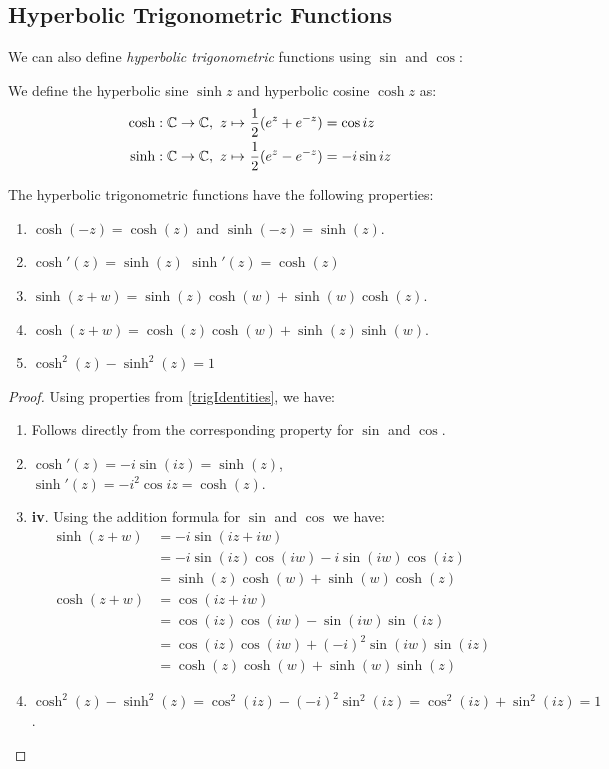 \documentclass[../main.tex]{subfiles}
\begin{document}
\subsection{Hyperbolic Trigonometric Functions}
We can also define \textit{hyperbolic trigonometric} functions using $\sin$ and $\cos$:
\begin{definition}
  We define the hyperbolic sine $\sinh z$ and hyperbolic cosine $\cosh z$ as:
  \begin{align*}
    \cosh: \mathbb{C} \to \mathbb{C},\ z \mapsto&\ \frac{1}{2}(e^{z} + e^{-z}) = \cos iz \\
    \sinh: \mathbb{C} \to \mathbb{C},\ z \mapsto&\ \frac{1}{2}(e^{z} - e^{-z}) = -i \sin iz
  \end{align*}
\end{definition}
\begin{lemma}
  The hyperbolic trigonometric functions have the following properties:
  \begin{enumerate}
    \item $\cosh(-z) = \cosh(z)$ and $\sinh(-z) = \sinh(z)$.
    \item $\cosh'(z) = \sinh(z)$ $\sinh'(z) = \cosh(z)$
    \item $\sinh(z + w) = \sinh(z)\cosh(w) + \sinh(w)\cosh(z)$.
    \item $\cosh(z + w) = \cosh(z)\cosh(w) + \sinh(z)\sinh(w)$.
    \item $\cosh^2(z) - \sinh^2(z) = 1$
  \end{enumerate}
\end{lemma}
\begin{proof}
  Using properties from \cref{trigIdentities}, we have:
  \begin{enumerate}
    \item Follows directly from the corresponding property for $\sin$ and $\cos$.
    \item $\cosh'(z) = -i \sin(iz) = \sinh(z)$, $\sinh'(z) = -i^2 \cos iz = \cosh(z)$.
    \item \textbf{iv}. Using the addition formula for $\sin$ and $\cos$ we have:
      \begin{align*}
        \sinh(z + w) &= -i\sin(iz + iw) \\
                     &= -i\sin(iz)\cos(iw) -i\sin(iw)\cos(iz) \\
                     &= \sinh(z)\cosh(w) + \sinh(w)\cosh(z) \\
        \cosh(z + w) &= \cos(iz + iw) \\
                     &= \cos(iz)\cos(iw) - \sin(iw)\sin(iz) \\
                     &= \cos(iz)\cos(iw) + (-i)^2\sin(iw)\sin(iz) \\
                     &= \cosh(z)\cosh(w) + \sinh(w)\sinh(z)
      \end{align*}
    \item $\cosh^2(z) - \sinh^2(z) = \cos^2(iz) - (-i)^2\sin^2(iz) = \cos^2(iz) + \sin^2(iz) = 1$.
  \end{enumerate}
\end{proof}
\end{document}
